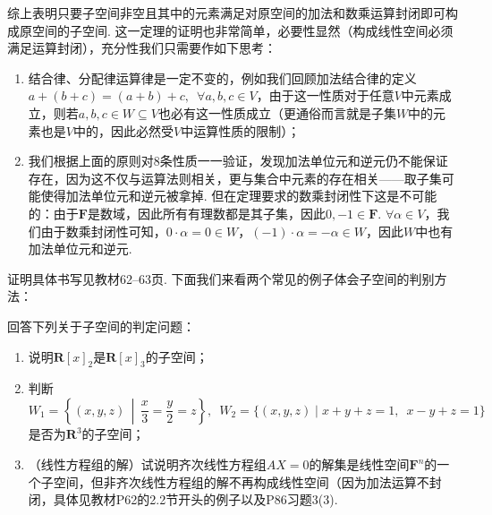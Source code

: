 综上表明只要子空间非空且其中的元素满足对原空间的加法和数乘运算封闭即可构成原空间的子空间. 这一定理的证明也非常简单，必要性显然（构成线性空间必须满足运算封闭），充分性我们只需要作如下思考：
\begin{enumerate}
    \item 结合律、分配律运算律是一定不变的，例如我们回顾加法结合律的定义$a+(b+c)=(a+b)+c,\enspace\forall a,b,c\in V$，由于这一性质对于任意$V$中元素成立，则若$a,b,c\in W\subseteq V$也必有这一性质成立（更通俗而言就是子集$W$中的元素也是$V$中的，因此必然受$V$中运算性质的限制）；

    \item 我们根据上面的原则对8条性质一一验证，发现加法单位元和逆元仍不能保证存在，因为这不仅与运算法则相关，更与集合中元素的存在相关——取子集可能使得加法单位元和逆元被拿掉. 但在定理要求的数乘封闭性下这是不可能的：由于$\mathbf{F}$是数域，因此所有有理数都是其子集，因此$0,-1\in\mathbf{F}$. $\forall \alpha\in V$，我们由于数乘封闭性可知，$0\cdot\alpha=0\in W$，$(-1)\cdot\alpha=-\alpha\in W$，因此$W$中也有加法单位元和逆元.
\end{enumerate}

证明具体书写见教材62--63页. 下面我们来看两个常见的例子体会子空间的判别方法：
\begin{example}\label{ex:2:常见子空间}
    回答下列关于子空间的判定问题：
    \begin{enumerate}
        \item \label{item:2:常见子空间:1}
              说明$\mathbf{R}[x]_2$是$\mathbf{R}[x]_3$的子空间；

        \item \label{item:2:常见子空间:2}
              判断$W_1=\left\{(x,y,z) \,\middle|\, \dfrac{x}{3}=\dfrac{y}{2}=z\right\},\enspace W_2=\{(x,y,z) \mid x+y+z=1,\enspace x-y+z=1\}$是否为$\mathbf{R}^3$的子空间；

        \item \label{item:2:常见子空间:3}
              （线性方程组的解）试说明齐次线性方程组$AX=0$的解集是线性空间$\mathbf{F}^n$的一个子空间，但非齐次线性方程组的解不再构成线性空间（因为加法运算不封闭，具体见教材P62的2.2节开头的例子以及P86习题3(3).
    \end{enumerate}
\end{example}

